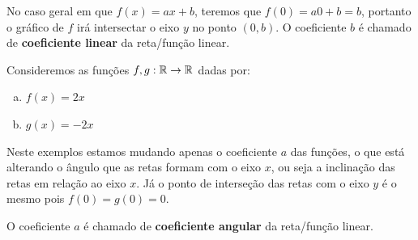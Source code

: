   No caso geral em que $f(x)=ax+b$, teremos que $f(0)=a0 + b= b$, portanto o gráfico de $f$ irá intersectar o eixo $y$ no ponto $(0,b)$. O coeficiente $b$ é chamado de \textbf{coeficiente linear} da reta/função linear.

\begin{exem}
  Consideremos as funções $f, g: \mathbb{R} \to \mathbb{R}$ dadas por:
 \begin{enumerate}[a)]
  \item $f(x)= 2x$
  \item $g(x)= -2x$
 \end{enumerate}

 \begin{figure}[H]
  \end{figure}
    
  Neste exemplos estamos mudando apenas o coeficiente $a$ das funções, o que está alterando o ângulo que as retas formam com o eixo $x$, ou seja a inclinação das retas em relação ao eixo $x$. Já o ponto de interseção das retas com o eixo $y$ é o mesmo pois $f(0)= g(0)= 0$.
  \end{exem}
  
  O coeficiente $a$ é chamado de \textbf{coeficiente angular} da reta/função linear.

